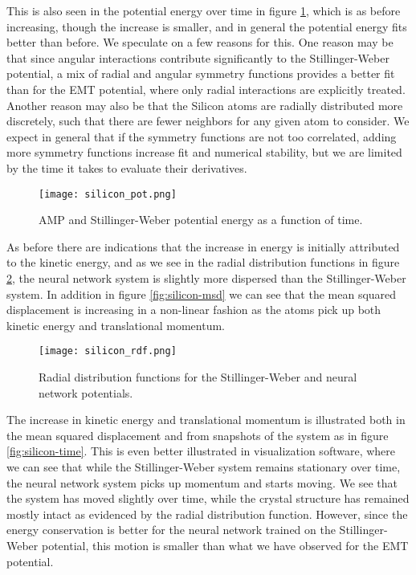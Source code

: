This is also seen in the potential energy over time 
in figure \ref{fig:silicon-pot}, which is as before increasing,
though the increase is smaller, and in general the potential energy 
fits better than before.
We speculate on a few reasons for this.
One reason may be that since angular interactions contribute significantly to the
Stillinger-Weber potential, a mix of radial and angular symmetry functions
provides a better fit than for the EMT potential, where only radial interactions
are explicitly treated.
Another reason may also be that the Silicon atoms are radially distributed
more discretely, such that there are fewer neighbors for any given
atom to consider.
We expect in general that if the symmetry functions are not too correlated,
adding more symmetry functions increase fit and numerical stability, but
we are limited by the time it takes to evaluate their derivatives.

\begin{figure}[H]
    \centering
    \texttt{[image: silicon\_pot.png]}
    \caption{AMP and Stillinger-Weber potential energy as a function of time.}
    \label{fig:silicon-pot}
\end{figure}

As before there are indications that the increase in energy 
is initially attributed to the kinetic energy,
and as we see in the radial distribution functions in figure 
\ref{fig:silicon-rdf}, the neural network
system is slightly more dispersed than the Stillinger-Weber system.
In addition in figure \ref{fig:silicon-msd} we can see that the mean squared
displacement is increasing in a non-linear fashion as the atoms pick up
both kinetic energy and translational momentum.

\begin{figure}[H]
    \centering
    \texttt{[image: silicon\_rdf.png]}
    \caption{Radial distribution functions for the Stillinger-Weber and
        neural network potentials.}
    \label{fig:silicon-rdf}
\end{figure}

The increase in kinetic energy and translational momentum is illustrated
both in the mean squared displacement and from snapshots of the system
as in figure \ref{fig:silicon-time}. This is even better illustrated
in visualization software, where we can see that while the
Stillinger-Weber system remains stationary over time, the neural network
system picks up momentum and starts moving.
We see that the system has moved slightly over time, while the crystal
structure has remained mostly intact as evidenced by the radial distribution
function.
However, since the energy conservation is better for the neural network
trained on the Stillinger-Weber potential, this motion is smaller
than what we have observed for the EMT potential.

